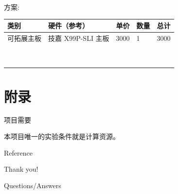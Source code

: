 \documentclass[ignorenonframetext,]{beamer}
\newif\ifbibliography
\begin{document}
\begin{frame}{方案:}

\begin{longtable}[]{@{}lllll@{}}
\toprule
类别 & 硬件（参考） & 单价 & 数量 & 总计\tabularnewline
\midrule
\endhead
可拓展主板 & 技嘉 X99P-SLI 主板 & 3000 & 1 & 3000\tabularnewline
& & & &\tabularnewline
& & & &\tabularnewline
& & & &\tabularnewline
& & & &\tabularnewline
& & & &\tabularnewline
& & & &\tabularnewline
& & & &\tabularnewline
& & & &\tabularnewline
& & & &\tabularnewline
\bottomrule
\end{longtable}

\end{frame}

\section{附录}\label{ux9644ux5f55}

\begin{frame}{项目需要}

本项目唯一的实验条件就是计算资源。

\end{frame}

\renewcommand\refname{Reference}
\begin{frame}[allowframebreaks]{Reference}
\bibliographytrue

\end{frame}


\begin{frame}
\begin{center}
\Huge{{Thank you!}}
\end{center}
\end{frame}
\begin{frame}
\begin{center}
\Huge{{Questions/Answers}}
\end{center}
\end{frame}
\end{document}
